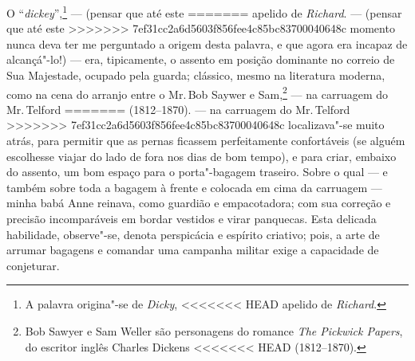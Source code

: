 {{{{{{{{{{{{%
O ``\textit{dickey}'',\footnote{A palavra origina"-se de \textit{Dicky}, 
<<<<<<< HEAD
  apelido de \textit{Richard}.} --- (pensar que até este \label{dickey}
=======
  apelido de \textit{Richard}.  --- (pensar que até este \label{dickey}
>>>>>>> 7ef31cc2a6d5603f856fee4c85bc83700040648c
momento nunca deva ter me perguntado a origem desta palavra, e que agora
era incapaz de alcançá"-lo!) --- era, tipicamente, o assento em posição
dominante no correio de Sua Majestade, ocupado pela guarda; clássico,
mesmo na literatura moderna, como na cena do arranjo entre o Mr.\,Bob
Saywer e Sam,\footnote{Bob Sawyer e Sam Weller são personagens do romance
  \textit{The Pickwick Papers}, do escritor inglês Charles Dickens
<<<<<<< HEAD
  (1812--1870).} --- na carruagem do Mr.\,Telford
=======
  (1812--1870).  --- na carruagem do Mr.\,Telford
>>>>>>> 7ef31cc2a6d5603f856fee4c85bc83700040648c
localizava"-se muito atrás, para permitir que as pernas ficassem
perfeitamente confortáveis (se alguém escolhesse viajar do lado de fora
nos dias de bom tempo), e para criar, embaixo do assento, um bom espaço
para o porta"-bagagem traseiro. Sobre o qual --- e também sobre toda a
bagagem à frente e colocada em cima da carruagem --- minha babá Anne
reinava, como guardião e empacotadora; com sua correção e precisão
incomparáveis em bordar vestidos e virar panquecas. Esta delicada
habilidade, observe"-se, denota perspicácia e espírito criativo; pois, a
arte de arrumar bagagens e comandar uma campanha militar exige a
capacidade de conjeturar.

}}}}}}}}}}}}
